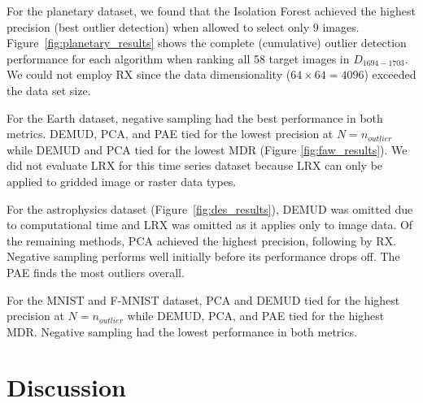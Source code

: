 \documentclass[letterpaper]{article} %
\newcommand{\todo}[1]{\textcolor{blue}{#1}}
\begin{document}
%

For the planetary dataset, we found that
the Isolation Forest achieved the highest precision (best outlier
detection) when allowed to select only \num{9} images.
Figure~\ref{fig:planetary_results} shows the complete (cumulative)
outlier detection performance for each algorithm when ranking
all \num{58} target images in $D_{1694-1703}$. We could not
employ RX since the data dimensionality ($64 \times 64 =
4096$) exceeded the data set size. 

For the Earth dataset, negative sampling had the best performance
in both metrics. DEMUD, PCA, and PAE tied for the lowest precision at 
$N=n_{outlier}$ while DEMUD and PCA tied for the lowest
MDR (Figure \ref{fig:faw_results}). We did not evaluate LRX for this time 
series dataset because LRX can only be applied to gridded image or raster 
data types.

For the astrophysics dataset (Figure~\ref{fig:des_results}), DEMUD was omitted due to computational time 
and LRX was omitted as it applies only to image data.  Of the remaining methods, 
PCA achieved the highest precision, following by RX.  Negative sampling 
performs well initially before its performance drops off.  The PAE finds the most outliers 
overall.  

For the MNIST and F-MNIST dataset, PCA and DEMUD tied for the highest
 precision at $N=n_{outlier}$
while DEMUD, PCA, and PAE tied for the highest MDR. Negative sampling had the 
lowest performance in both metrics. 

\section{Discussion}
\end{document}
